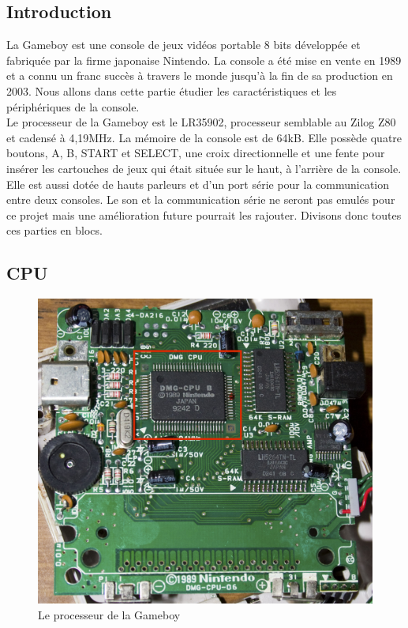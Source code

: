 \documentclass[a4paper]{article}
\begin{document}
\subsection{Introduction}
La Gameboy est une console de jeux vidéos portable 8 bits développée et fabriquée
par la firme japonaise Nintendo. La console a été mise en vente en 1989 et a connu
un franc succès à travers le monde jusqu'à la fin de sa production en 2003.
Nous allons dans cette partie étudier les caractéristiques et les périphériques
de la console. \\

Le processeur de la Gameboy est le LR35902, processeur semblable au Zilog Z80 et
cadensé à 4,19MHz. La mémoire de la console est de 64kB. Elle possède quatre boutons, 
A, B, START et SELECT, une croix directionnelle et une fente pour insérer les 
cartouches de jeux qui était située sur le haut, à l'arrière de la console. Elle est
aussi dotée de hauts parleurs et d'un port série pour la communication entre deux
consoles. Le son et la communication série ne seront pas emulés pour ce projet
mais une amélioration future pourrait les rajouter. Divisons donc toutes ces parties
en blocs.

\newpage


\subsection{CPU}

\begin{figure}[!h]
  \centering
  \includegraphics[scale=0.1]{images/cpu.jpg}
  \caption{Le processeur de la Gameboy}
\end{figure}
\end{document}
